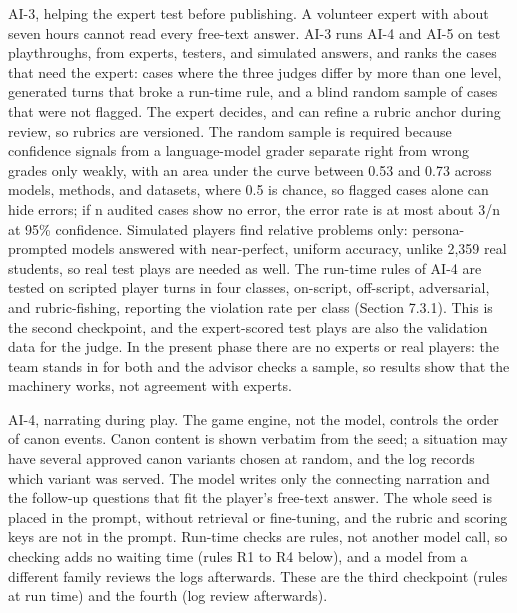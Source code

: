 AI-3, helping the expert test before publishing. A volunteer expert with about seven hours cannot read every free-text answer. AI-3 runs AI-4 and AI-5 on test playthroughs, from experts, testers, and simulated answers, and ranks the cases that need the expert: cases where the three judges differ by more than one level, generated turns that broke a run-time rule, and a blind random sample of cases that were not flagged. The expert decides, and can refine a rubric anchor during review, so rubrics are versioned. The random sample is required because confidence signals from a language-model grader separate right from wrong grades only weakly, with an area under the curve between 0.53 and 0.73 across models, methods, and datasets, where 0.5 is chance\cite{r117}, so flagged cases alone can hide errors; if n audited cases show no error, the error rate is at most about 3/n at 95\% confidence\cite{r118}. Simulated players find relative problems only: persona-prompted models answered with near-perfect, uniform accuracy, unlike 2,359 real students\cite{r119}, so real test plays are needed as well. The run-time rules of AI-4 are tested on scripted player turns in four classes, on-script, off-script, adversarial, and rubric-fishing, reporting the violation rate per class (Section 7.3.1). This is the second checkpoint, and the expert-scored test plays are also the validation data for the judge. In the present phase there are no experts or real players: the team stands in for both and the advisor checks a sample, so results show that the machinery works, not agreement with experts.

AI-4, narrating during play. The game engine, not the model, controls the order of canon events. Canon content is shown verbatim from the seed; a situation may have several approved canon variants chosen at random, and the log records which variant was served. The model writes only the connecting narration and the follow-up questions that fit the player's free-text answer. The whole seed is placed in the prompt, without retrieval or fine-tuning, and the rubric and scoring keys are not in the prompt. Run-time checks are rules, not another model call, so checking adds no waiting time (rules R1 to R4 below), and a model from a different family reviews the logs afterwards. These are the third checkpoint (rules at run time) and the fourth (log review afterwards).

